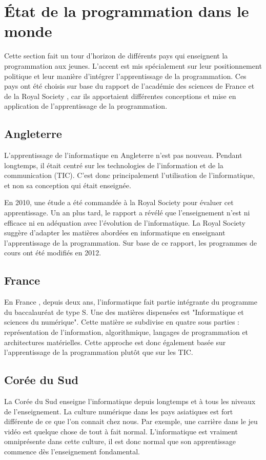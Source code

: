 \section{État de la programmation dans le monde}
\label{monde}
Cette section fait un tour d'horizon de différents pays qui enseignent la programmation aux jeunes. L'accent est mis spécialement sur leur positionnement politique et leur manière d'intégrer l'apprentissage de la programmation. Ces pays ont été choisis sur base du rapport de l'académie des sciences de France \cite{ens-info-fr} et de la Royal Society \cite{comput-school}, car ils apportaient différentes conceptions et mise en application de l'apprentissage de la programmation.

\subsection{Angleterre}
L'apprentissage de l'informatique en Angleterre \cite{status-guid} n'est pas nouveau. Pendant longtemps, il était centré sur les technologies de l'information et de la communication (TIC). C'est donc principalement l'utilisation de l'informatique, et non sa conception qui était enseignée.

En 2010, une étude a été commandée à la Royal Society pour évaluer cet apprentissage. Un an plus tard, le rapport a révélé que l'enseignement n'est ni efficace ni en adéquation avec l'évolution de l'informatique. La Royal Society suggère d'adapter les matières abordées en informatique en enseignant l'apprentissage de la programmation. Sur base de ce rapport, les programmes de cours ont été modifiés en 2012.

\subsection{France}
En France \cite{wiki-info-et-sc-du-num} \cite{wiki-bac-sc}, depuis deux ans, l'informatique fait partie intégrante du programme du baccalauréat de type S. Une des matières dispensées est "Informatique et sciences du numérique". Cette matière se subdivise en quatre sous parties : représentation de l'information, algorithmique, langages de programmation et architectures matérielles. Cette approche est donc également basée sur l'apprentissage de la programmation plutôt que sur les TIC.

\subsection{Corée du Sud}
La Corée du Sud enseigne l'informatique depuis longtemps et à tous les niveaux de l'enseignement. La culture numérique dans les pays asiatiques est fort différente de ce que l'on connait chez nous. Par exemple, une carrière dans le jeu vidéo est quelque chose de tout à fait normal. L'informatique est vraiment omniprésente dans cette culture, il est donc normal que son apprentissage commence dès l'enseignement \gls{fondamental}.

